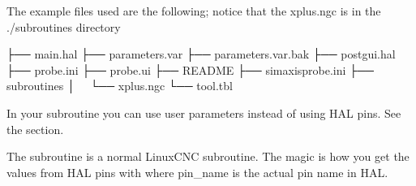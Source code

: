 \documentclass[letterpaper,10pt,english]{sphinxmanual}
\begin{document}
\sphinxAtStartPar
The example files used are the following; notice that the xplus.ngc is in
the ./subroutines directory

\begin{sphinxVerbatim}[commandchars=\\\{\}]
├── main.hal
├── parameters.var
├── parameters.var.bak
├── postgui.hal
├── probe.ini
├── probe.ui
├── README
├── sim\PYGZus{}axis\PYGZus{}probe.ini
├── subroutines
│   └── xplus.ngc
└── tool.tbl
\end{sphinxVerbatim}

\sphinxAtStartPar
In your subroutine you can use user parameters instead of using HAL pins.
See the {\hyperref[\detokenize{parameters::doc}]{}} section.

\sphinxAtStartPar
The subroutine is a normal LinuxCNC subroutine. The magic is how you get the
values from HAL pins with  where pin\_name is the actual
pin name in HAL.
\end{document}
